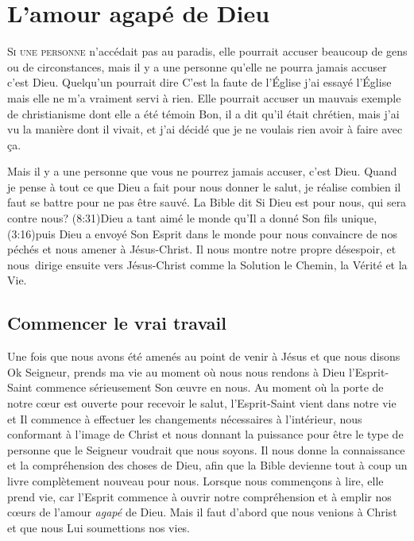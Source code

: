 \chapter{L'amour agap\'e de Dieu}

\lettrine{S}{i une personne} n'accédait pas au paradis,
 elle pourrait accuser beaucoup de gens
 ou de circonstances, mais il y a une personne
 qu'elle ne pourra jamais accuser\frcolon{} c'est Dieu.
 Quelqu'un pourrait dire\frcolon{}
 \Og C'est la faute de l'Église\frcolon{} j'ai essayé l'Église mais
 elle ne m'a vraiment servi à rien. \Fg{}
 Elle pourrait accuser un mauvais exemple de christianisme
 dont elle a été témoin\frcolon{}
 \Og Bon, il a dit qu'il était chrétien, mais j'ai vu la manière
 dont il vivait, et j'ai décidé que je ne voulais rien avoir à faire
 avec ça. \Fg{}

Mais il y a une personne que vous ne pourrez jamais accuser, c'est Dieu.
 Quand je pense à tout ce que Dieu a fait pour nous donner le salut,
 je réalise combien il faut se battre pour ne pas être sauvé.
 La Bible dit\frcolon{}
 \Og Si Dieu est pour nous, qui sera contre nous? \Fg{}
 (8:31)Dieu a tant aimé le monde qu'Il a donné
 Son fils unique, (3:16)puis Dieu a envoyé Son Esprit
 dans le monde pour nous convaincre
 de nos péchés et nous amener à Jésus-Christ.
 Il nous montre notre propre désespoir, et nous~dirige ensuite
 vers Jésus-Christ comme la Solution \ocadr le Chemin, la Vérité et la Vie.

\section{Commencer le vrai travail}

Une fois que nous avons été amenés au point de venir à Jésus
 et que nous disons\frcolon{}
 \Og Ok Seigneur, prends ma vie \Fg{}
 \ocadr au moment où nous nous rendons à Dieu \fcadr
 l'Esprit-Saint commence sérieusement Son œuvre en nous.
 Au moment où la porte de notre cœur est ouverte pour recevoir le salut,
 l'Esprit-Saint vient dans notre vie et Il commence à effectuer
 les changements nécessaires à l'intérieur, nous conformant
 à l'image de Christ et nous donnant la puissance pour être
 le type de personne que le Seigneur voudrait que nous soyons.
 Il nous donne la connaissance et la compréhension des choses de Dieu,
 afin que la Bible devienne tout à coup un livre complètement
 nouveau pour nous. Lorsque nous commençons à lire,
 elle prend vie, car l'Esprit commence à ouvrir notre compréhension
 et à emplir nos cœurs de l'amour \emph{agapé} de Dieu.
 Mais il faut d'abord que nous venions à Christ
 et que nous Lui soumettions nos vies.

